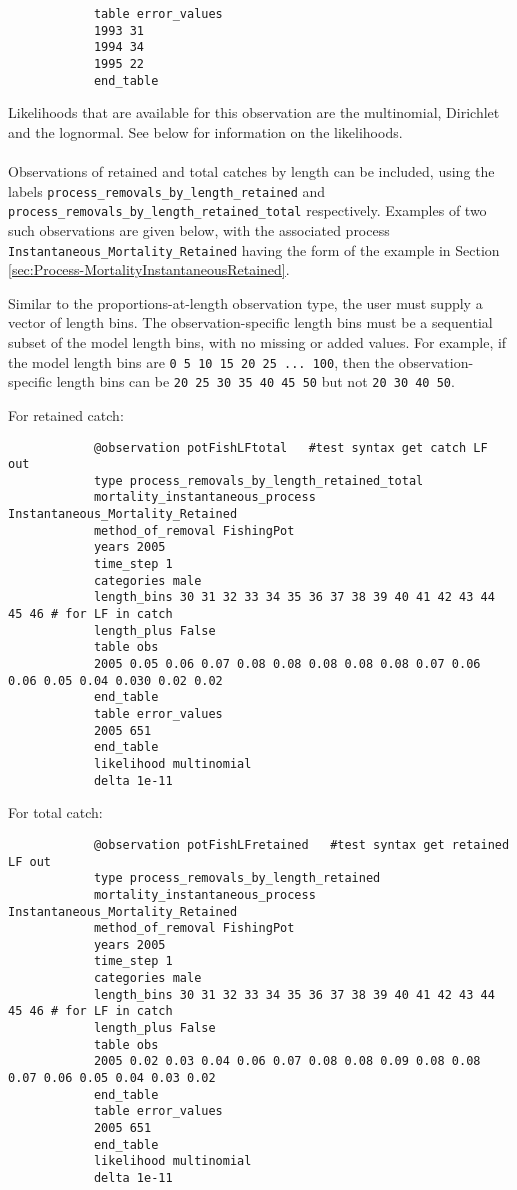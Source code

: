 \begin{itemize}
{{\begin{verbatim}
			table error_values
			1993 31
			1994 34
			1995 22
			end_table
			\end{verbatim}}}
	
	Likelihoods that are available for this observation are the multinomial, Dirichlet and the lognormal. See below for information on the likelihoods.
	
	\paragraph*{}\label{sec:Observation-ProcessRemovalsByLengthRetained}\label{sec:Observation-ProcessRemovalsByLengthRetainedTotal}
	
	Observations of retained and total catches by length can be included, using the labels \texttt{process\_removals\_by\_length\_retained} and \texttt{process\_removals\_by\_length\_retained\_total} respectively. Examples of two such observations are given below, with the associated process \texttt{Instantaneous\_Mortality\_Retained} having the form of the example in Section \ref{sec:Process-MortalityInstantaneousRetained}.
	
	Similar to the proportions-at-length observation type, the user must supply a vector of length bins. The observation-specific length bins must be a sequential subset of the model length bins, with no missing or added values. For example, if the model length bins are \texttt{0 5 10 15 20 25 ... 100}, then the observation-specific length bins can be \texttt{20 25 30 35 40 45 50} but not \texttt{20 30 40 50}.
	
	For retained catch:
	
	{\small{\begin{verbatim}
			@observation potFishLFtotal   #test syntax get catch LF out
			type process_removals_by_length_retained_total
			mortality_instantaneous_process Instantaneous_Mortality_Retained
			method_of_removal FishingPot
			years 2005
			time_step 1
			categories male
			length_bins 30 31 32 33 34 35 36 37 38 39 40 41 42 43 44 45 46 # for LF in catch
			length_plus False
			table obs
			2005 0.05 0.06 0.07 0.08 0.08 0.08 0.08 0.08 0.07 0.06 0.06 0.05 0.04 0.030 0.02 0.02
			end_table
			table error_values
			2005 651
			end_table
			likelihood multinomial
			delta 1e-11
			\end{verbatim}}}
	
	For total catch:
	
	{\small{\begin{verbatim}
			@observation potFishLFretained   #test syntax get retained LF out
			type process_removals_by_length_retained
			mortality_instantaneous_process Instantaneous_Mortality_Retained
			method_of_removal FishingPot
			years 2005
			time_step 1
			categories male
			length_bins 30 31 32 33 34 35 36 37 38 39 40 41 42 43 44 45 46 # for LF in catch
			length_plus False
			table obs
			2005 0.02 0.03 0.04 0.06 0.07 0.08 0.08 0.09 0.08 0.08 0.07 0.06 0.05 0.04 0.03 0.02
			end_table
			table error_values
			2005 651
			end_table
			likelihood multinomial
			delta 1e-11
			\end{verbatim}}}
	

\end{itemize}
